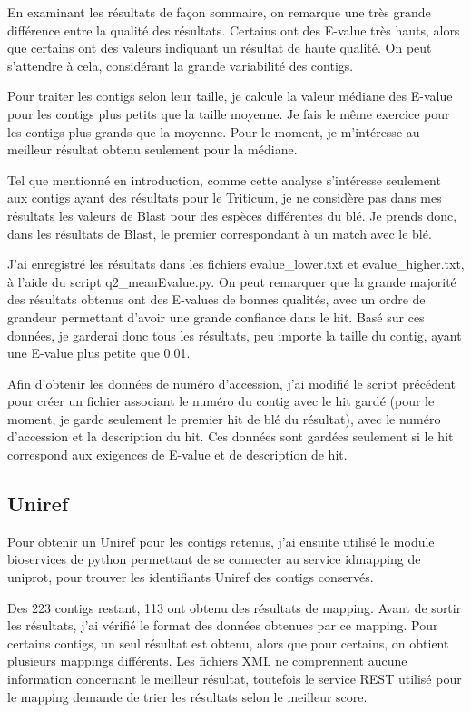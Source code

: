 \documentclass[10.9pt]{article} %
\begin{document}
En examinant les résultats de façon sommaire, on remarque une très grande différence entre la qualité des
résultats. Certains ont des E-value très hauts, alors que certains ont des valeurs indiquant un résultat de
haute qualité. On peut s'attendre à cela, considérant la grande variabilité des contigs.

Pour traiter les contigs selon leur taille, je calcule la valeur médiane des E-value pour les contigs plus
petits que la taille moyenne. Je fais le même exercice pour les contigs plus grands que la moyenne. Pour
le moment, je m'intéresse au meilleur résultat obtenu seulement pour la médiane.

Tel que mentionné en introduction, comme cette analyse s'intéresse seulement aux contigs ayant des résultats
pour le Triticum, je ne considère pas dans mes résultats les valeurs de Blast pour des espèces différentes
du blé. Je prends donc, dans les résultats de Blast, le premier correspondant à un match avec le blé.

J'ai enregistré les résultats dans les fichiers evalue\_lower.txt et evalue\_higher.txt, à l'aide du script
q2\_meanEvalue.py. On peut remarquer que la grande majorité des résultats  obtenus ont des E-values de bonnes
qualités, avec un ordre de grandeur permettant d'avoir une grande confiance dans le hit. Basé sur ces données,
je garderai donc tous les résultats, peu importe la taille du contig, ayant une E-value plus petite que 0.01.

Afin d'obtenir les données de numéro d'accession, j'ai modifié le script précédent pour créer un fichier associant
le numéro du contig avec le hit gardé (pour le moment, je garde seulement le premier hit de blé du résultat), avec
le numéro d'accession et la description du hit. Ces données sont gardées seulement si le hit correspond aux
exigences de E-value et de description de hit.

\subsection{Uniref}

Pour obtenir un Uniref \cite{Uniref} pour les contigs retenus, j'ai ensuite utilisé le module bioservices de python permettant
de se connecter au service idmapping de uniprot, pour trouver les identifiants Uniref des contigs conservés.

Des 223 contigs restant, 113 ont obtenu des résultats de mapping. Avant de sortir les résultats, j'ai vérifié
le format des données obtenues par ce mapping. Pour certains contigs, un seul résultat est obtenu, alors que
pour certains, on obtient plusieurs mappings différents. Les fichiers XML ne comprennent aucune information
concernant le meilleur résultat, toutefois le service REST utilisé pour le mapping demande de trier les
résultats selon le meilleur score.
\end{document}
